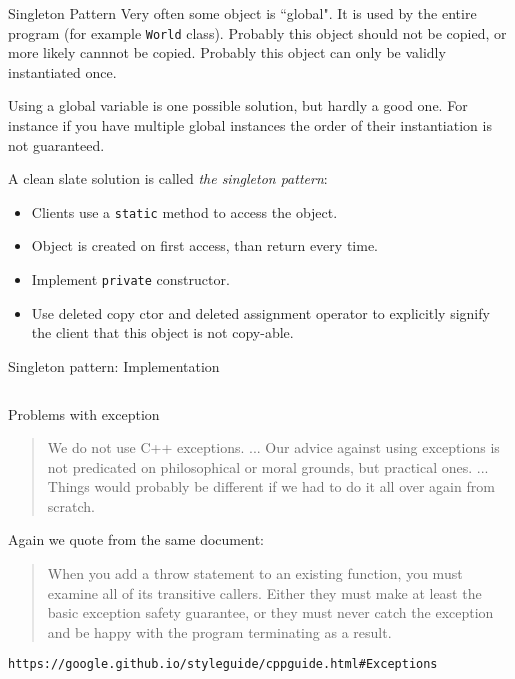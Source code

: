 \begin{frame}{Singleton Pattern}
Very often some object is ``global". It is used by the entire program (for example \texttt{World} class). Probably this object should not be copied, or more likely cannnot be copied. Probably this object can only be validly instantiated once.

Using a global variable is one possible solution, but hardly a good one. For instance if you have multiple global instances the order of their instantiation is not guaranteed. 

A clean slate solution is called \textit{the singleton pattern}:

\begin{itemize}
	\item Clients use a \texttt{static} method to access the object.
	\item Object is created on first access, than return every time.
	\item Implement \texttt{private} constructor.
	\item Use deleted copy ctor and deleted assignment operator to explicitly signify the client that this object is not copy-able.
\end{itemize}
\end{frame}

\begin{frame}{Singleton pattern: Implementation}
\inputminted[fontsize=\small]{c++}{code/rc10sgt/sgt.h}
\end{frame}

\begin{frame}[fragile]{Problems with exception}
\begin{quotation}
	\alert{We do not use C++ exceptions}. ... Our advice against using exceptions is not predicated on philosophical or moral grounds, but practical ones. ... Things would probably be different if we had to do it all over again from scratch.
\end{quotation}


Again we quote from the same document:
\begin{quotation}
	When you add a throw statement to an existing function, you must examine all of its transitive callers. Either they must make at least the \alert{basic exception safety guarantee}, or they must never catch the exception and be happy with the program terminating as a result.
\end{quotation}

\tiny{\verb|https://google.github.io/styleguide/cppguide.html#Exceptions|}
\end{frame}

